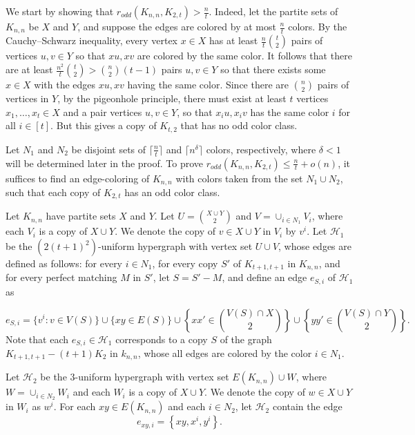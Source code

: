 \documentclass{article}
\theoremstyle{definition}
\newcommand\cH{{\mathcal H}}
\newcommand{\oram}{r_{odd}}
\begin{document}
We start by showing that 
$\oram \left(K_{n,n}, K_{2,t} \right)>\frac{n}{t}$. Indeed, let the partite sets of $K_{n,n}$ be $X$ and $Y$, and suppose the edges are colored by at most   $\frac{n}{t}$ colors. By the Cauchy–Schwarz inequality, every vertex $x\in X$ has at least $\frac{n}{t}{t\choose 2}$  pairs of vertices $u,v \in Y$ so that $xu,xv$ are colored by the same color. It follows that there are  at least $\frac{n^2}{t}{t\choose 2}> {n\choose 2}(t-1)$ pairs  $u,v \in Y$ so that there exists some $x\in X$ with the edges $xu,xv$ having the same color. Since there are ${n\choose 2}$ pairs of vertices in $Y$, by the pigeonhole principle, there must exist at least $t$ vertices $x_1,\dots,x_t \in X$ and a pair vertices $u,v \in Y$, so that $x_iu, x_iv$ has the same color $i$ for all $i\in [t]$. But this gives a copy of $K_{t,2}$ that has no odd color class.  


Let $N_1$ and $N_2$ be disjoint sets of $\lceil \frac{n}{t}\rceil$ and $\lceil n^\delta \rceil$ colors, respectively,  where $\delta<1$ will be determined later in the proof.
To prove $\oram \left(K_{n,n}, K_{2,t} \right)\leq \frac{n}{t} + o(n)$, it suffices to find an edge-coloring of $K_{n,n}$ with colors taken from the set $N_1  \cup N_2$, such that each copy of $K_{2,t}$ has an odd color class.

Let $K_{n,n}$ have partite sets $X$ and $Y$.  Let $U = \binom{X \cup Y}{2}$ and $V = \cup_{i \in N_1} V_i$, where each $V_i$ is a copy of $X \cup Y$.  We denote the copy of $v \in X \cup Y$ in $V_i$ by $v^i$.  Let $\cH_1$ be the $(2(t+1)^2)$-uniform hypergraph with vertex set $U \cup V$, whose edges are defined as follows: for every $i \in N_1$,  for every copy $S'$ of $K_{t+1,t+1}$ in $K_{n,n}$, and for every perfect matching $M$ in $S'$, let $S=S'-M$, and define an edge  $e_{S,i}$ of $\cH_1$  as 




    $$
        e_{S,i} =\{v^i \colon v\in V(S)\}\cup \{xy\in E(S) \} \cup \left\{xx'\in\binom{V(S)\cap X}{2} \right\} \cup \left\{ yy'\in \binom{V(S)\cap Y}{2}\right\}.
    $$
Note that each $e_{S,i} \in \cH_1$ corresponds to a copy $S$  of the graph $K_{t+1,t+1} - (t+1)K_2 $ in $k_{n,n}$, whose all edges  are colored by the color $i \in N_1$. 
    


Let $\cH_2$ be the 3-uniform hypergraph with vertex set $E(K_{n,n}) \cup W$, where $W = \cup_{i \in N_2} W_i$ and each $W_i$ is a copy of $X \cup Y$.  We denote the copy of $w \in X \cup Y$ in $W_i$ as $w^i$.  
For each $xy \in E(K_{n,n})$ and each $i \in N_2$, let  $\cH_2$ contain the edge
$$
    e_{xy,i} = \left\{ xy, x^{i}, y^{i} \right\}.
$$
\end{document}
